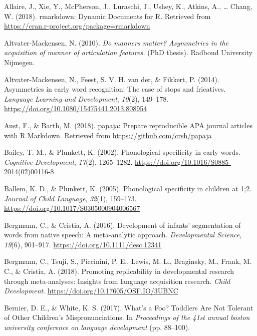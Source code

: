 \documentclass[
  english,
  man, noextraspace]{apa6}
\newlength{\cslhangindent}
\newenvironment{cslreferences}%
  {\setlength{\parindent}{0pt}%
  \everypar{\setlength{\hangindent}{\cslhangindent}}\ignorespaces}%
  {\par}
\begin{document}
\hypertarget{refs}{}
\begin{cslreferences}
\leavevmode\hypertarget{ref-RMarkdown}{}%
Allaire, J., Xie, Y., McPherson, J., Luraschi, J., Ushey, K., Atkins, A., \ldots{} Chang, W. (2018). rmarkdown: Dynamic Documents for R. Retrieved from \url{https://cran.r-project.org/package=rmarkdown}

\leavevmode\hypertarget{ref-Altvater2010}{}%
Altvater-Mackensen, N. (2010). \emph{Do manners matter? Asymmetries in the acquisition of manner of articulation features.} (PhD thesis). Radboud University Nijmegen.

\leavevmode\hypertarget{ref-Altvater2014}{}%
Altvater-Mackensen, N., Feest, S. V. H. van der, \& Fikkert, P. (2014). Asymmetries in early word recognition: The case of stops and fricatives. \emph{Language Learning and Development}, \emph{10}(2), 149--178. \url{https://doi.org/10.1080/15475441.2013.808954}

\leavevmode\hypertarget{ref-papaja}{}%
Aust, F., \& Barth, M. (2018). papaja: Prepare reproducible APA journal articles with R Markdown. Retrieved from \url{https://github.com/crsh/papaja}

\leavevmode\hypertarget{ref-Bailey2002}{}%
Bailey, T. M., \& Plunkett, K. (2002). Phonological specificity in early words. \emph{Cognitive Development}, \emph{17}(2), 1265--1282. \url{https://doi.org/10.1016/S0885-2014(02)00116-8}

\leavevmode\hypertarget{ref-Ballem2005}{}%
Ballem, K. D., \& Plunkett, K. (2005). Phonological specificity in children at 1;2. \emph{Journal of Child Language}, \emph{32}(1), 159--173. \url{https://doi.org/10.1017/S0305000904006567}

\leavevmode\hypertarget{ref-Bergmann2016}{}%
Bergmann, C., \& Cristia, A. (2016). Development of infants' segmentation of words from native speech: A meta-analytic approach. \emph{Developmental Science}, \emph{19}(6), 901--917. \url{https://doi.org/10.1111/desc.12341}

\leavevmode\hypertarget{ref-Bergmann2018}{}%
Bergmann, C., Tsuji, S., Piccinini, P. E., Lewis, M. L., Braginsky, M., Frank, M. C., \& Cristia, A. (2018). Promoting replicability in developmental research through meta-analyses: Insights from language acquisition research. \emph{Child Development}. \url{https://doi.org/10.17605/OSF.IO/3UBNC}

\leavevmode\hypertarget{ref-Bernier2017}{}%
Bernier, D. E., \& White, K. S. (2017). What's a Foo? Toddlers Are Not Tolerant of Other Children's Mispronunciations. In \emph{Proceedings of the 41st annual boston university conference on language development} (pp. 88--100).


\end{cslreferences}
\end{document}
